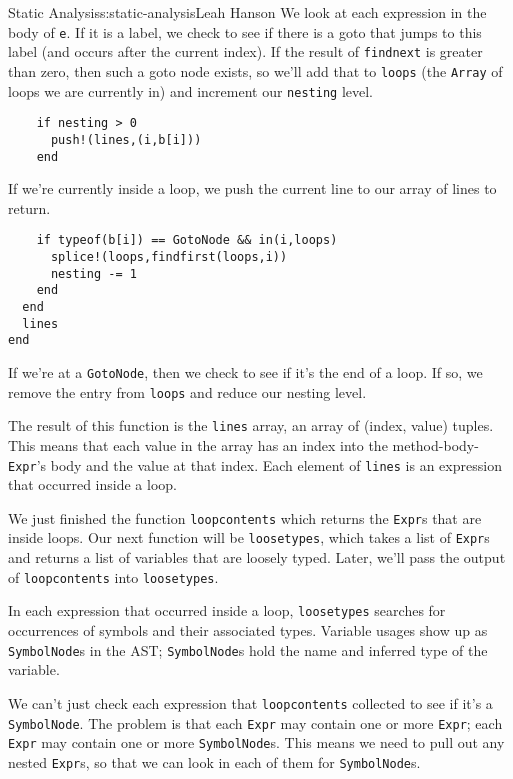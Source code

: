 \begin{aosachapter}{Static Analysis}{s:static-analysis}{Leah Hanson}
We look at each expression in the body of \texttt{e}. If it is a label,
we check to see if there is a goto that jumps to this label (and occurs
after the current index). If the result of \texttt{findnext} is greater
than zero, then such a goto node exists, so we'll add that to
\texttt{loops} (the \texttt{Array} of loops we are currently in) and
increment our \texttt{nesting} level.

\begin{verbatim}
    if nesting > 0
      push!(lines,(i,b[i]))
    end
\end{verbatim}

If we're currently inside a loop, we push the current line to our array
of lines to return.

\begin{verbatim}
    if typeof(b[i]) == GotoNode && in(i,loops)
      splice!(loops,findfirst(loops,i))
      nesting -= 1
    end
  end
  lines
end
\end{verbatim}

If we're at a \texttt{GotoNode}, then we check to see if it's the end of
a loop. If so, we remove the entry from \texttt{loops} and reduce our
nesting level.

The result of this function is the \texttt{lines} array, an array of
(index, value) tuples. This means that each value in the array has an
index into the method-body-\texttt{Expr}'s body and the value at that
index. Each element of \texttt{lines} is an expression that occurred
inside a loop.

\label{finding-and-typing-variables}

We just finished the function \texttt{loopcontents} which returns the
\texttt{Expr}s that are inside loops. Our next function will be
\texttt{loosetypes}, which takes a list of \texttt{Expr}s and returns a
list of variables that are loosely typed. Later, we'll pass the output
of \texttt{loopcontents} into \texttt{loosetypes}.

In each expression that occurred inside a loop, \texttt{loosetypes}
searches for occurrences of symbols and their associated types. Variable
usages show up as \texttt{SymbolNode}s in the AST; \texttt{SymbolNode}s
hold the name and inferred type of the variable.

We can't just check each expression that \texttt{loopcontents} collected
to see if it's a \texttt{SymbolNode}. The problem is that each
\texttt{Expr} may contain one or more \texttt{Expr}; each \texttt{Expr}
may contain one or more \texttt{SymbolNode}s. This means we need to pull
out any nested \texttt{Expr}s, so that we can look in each of them for
\texttt{SymbolNode}s.


\end{aosachapter}

